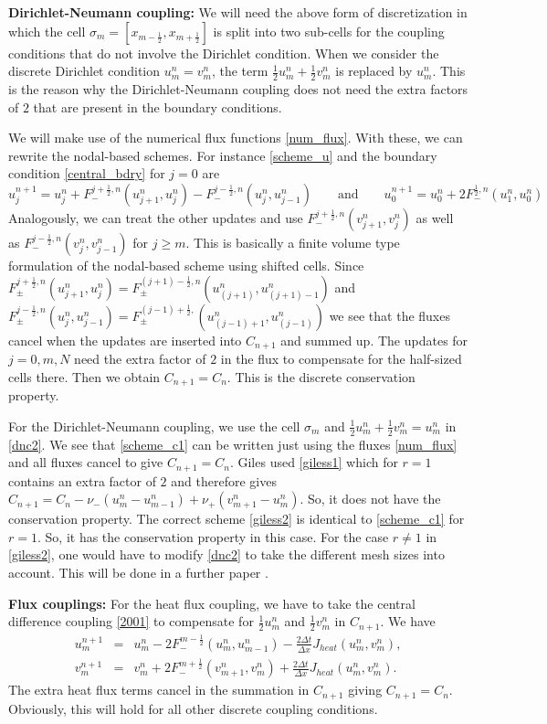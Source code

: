 \noindent
{\bf Dirichlet-Neumann coupling:}
We will need the above form of discretization in which the cell $\sigma_m = [x_{m-\frac{1}{2}}, x_{m+\frac{1}{2}}]$ 
is split into two sub-cells for the
coupling conditions that do not involve the Dirichlet condition.
When we consider the discrete Dirichlet condition $u_m^n =v_m^n$, 
the term $\frac{1}{2}u^n_m+\frac{1}{2}v^n_m$ is replaced by $u_m^n$.
This is the reason why the Dirichlet-Neumann coupling does not need the extra factors 
of $2$ that are present in the boundary conditions.

We will make use of the numerical flux functions \eqref{num_flux}.
With these, we can rewrite the nodal-based schemes. 
For instance \eqref{scheme_u} and the boundary condition \eqref{central_bdry} for $j=0$ are
%
$$
u_j^{n+1} = u_j^n + F_-^{j+\frac 12,n}(u_{j+1}^n,u_j^n)-F_-^{j-\frac 12,n}(u_j^n,u_{j-1}^n)
\qquad\text{and}\qquad u_0^{n+1} =u_0^n + 2F_-^{\frac 12,n}(u_{1}^n,u_0^n)
$$
%
Analogously, we can treat the other updates and use $F_-^{j+\frac 12,n}(v_{j+1}^n,v_j^n)$ as well as
$F_-^{j-\frac 12,n}(v_j^n,v_{j-1}^n)$ for $j\ge m$. This is basically a finite volume type formulation
of the nodal-based scheme using shifted cells.
Since $F_\pm^{j+\frac 12,n}(u_{j+1}^n,u_j^n) = F_\pm^{(j+1)-\frac 12,n}(u_{(j+1)}^n,u_{(j+1)-1}^n)$ 
and $F_\pm^{j-\frac 12,n}(u_j^n,u_{j-1}^n)=F_\pm^{(j-1)+\frac 12,}(u_{(j-1)+1}^n,u_{(j-1)}^n)$ we see that the
fluxes cancel when the updates are inserted into $C_{n+1}$ and summed up. The updates for $j=0,m,N$ need the extra factor of $2$
in the flux to compensate for the half-sized cells there. Then we obtain $C_{n+1} =C_n$. This is the discrete conservation
property.

For the Dirichlet-Neumann coupling, we use the cell $\sigma_m$ and $\frac{1}{2}u^n_m+\frac{1}{2}v^n_m =u_m^n$ in \eqref{dnc2}.
We see that \eqref{scheme_c1} can be written just using the fluxes
\eqref{num_flux} and all fluxes cancel to give $C_{n+1} =C_n$.
Giles \cite{GIL} used \eqref{giless1} which for $r=1$ contains an extra factor of $2$ and therefore gives
$C_{n+1} = C_n -\nu_-(u_m^n-u_{m-1}^n) +\nu_+(v_{m+1}^n-u_m^n)$. So, it does not have the conservation property.
The correct scheme \eqref{giless2} is identical to \eqref{scheme_c1} for $r=1$. So, it has the conservation property
in this case. For the case $r\ne 1$ in \eqref{giless2}, one would have to modify \eqref{dnc2} to take the different mesh sizes 
into account. This will be done in a further paper \cite{CMW3}.

\noindent
{\bf Flux couplings:}
For the heat flux coupling, we have to take the central difference coupling \eqref{2001} to compensate for $\frac 12u_m^n$ and
$\frac 12v_m^n$ in $C_{n+1}$. We have
%
\begin{eqnarray*}
u_m^{n+1} &=& u_m^n -2 F_-^{m-\frac12}(u_m^n,u_{m-1}^n) -\frac{2\Delta t}{\Delta x} J_{heat}(u^n_m,v_m^n),\\
v_m^{n+1} &=& v_m^n +2 F_-^{m+\frac12}(v_{m+1}^n,v_m^n) +\frac{2\Delta t}{\Delta x} J_{heat}(u^n_m,v_m^n).
\end{eqnarray*}
%
The extra heat flux terms cancel in the summation in $C_{n+1}$ giving $C_{n+1}=C_n$. 
Obviously, this will hold for all other discrete coupling conditions.


